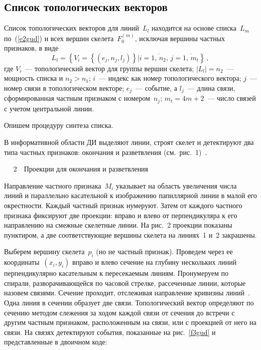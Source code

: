 \begin{multicols}{2}
\subsection{Список топологических векторов} %

Список топологических векторов для линий~$L_l$ находится на основе списка~$L_m$
по~(\ref{e2gud}) и всех вершин скелета~$F_0^{(m)}$, исключая вершины частных признаков, в
виде
\begin{equation}
L_l =\left \{ V_i =\left \{ (e_j, n_j, l_j)\right \}\vert i=\overline{1,\,n_2},\,j=\overline{1,\, m_t}\right
\}\,,
\label{e3gud}
\end{equation}
где $V_i$~--- топологический вектор для группы вершин скелета; $\vert L_l\vert =n_2$~---
мощность списка и $n_2>n_1$; $i$~--- индекс как номер топологического вектора; $j$~--- номер
связи в топологическом векторе; $e_j$~--- событие, а $l_j$~--- длина связи, сформированная
частным признаком с номером~$n_j$; $m_t =4m+2$~--- число связей с учетом центральной
линии.

Опишем процедуру синтеза списка.

В информативной области ДИ выделяют линии, строят скелет и детектируют два типа частных
признаков: окончания и разветвления (см.\ рис.~1)~\cite{5gud}.\linebreak\vspace*{-12pt} 
\begin{center} %
\vspace*{1pt}
\mbox{%
\epsfxsize=74.97mm
}
\vspace*{12pt}
{{\figurename~2}\ \ \small{Проекции для окончания и разветвления}}
\end{center}
\vspace*{6pt}


\addtocounter{figure}{1}

\noindent
Направление частного
признака~$M_i$ указывает на область увеличения числа линий и параллельно касательной к
изображению папиллярной линии в малой его окрестности. Каждый частный признак нумеруют.
Затем от каждого частного признака фиксируют две проекции: вправо и влево от перпендикуляра
к его направлению на смежные скелетные линии. На рис.~2 проекции показаны
пунктиром, а две соответствующие вершины скелета на линиях~1 и~2 закрашены.


Выберем вершину скелета~$p_i$ (но не частный признак). Проведем через ее
координаты~$(x_i,y_i)$ вправо и влево сечение на глубину нескольких линий
перпендикулярно касательным к пе\-ре\-се\-ка\-емым линиям. Пронумеруем по спирали,
разворачивающейся по часовой стрелке, рассеченные линии, которые назовем связями. Сечение
проходит, отслеживая направление кривизны линий~\cite{3gud}. Одна линия в сечении образует
две связи. Топологический вектор определяют по сечению методом слежения за ходом каждой
связи от сечения до встречи с другим частным признаком, расположенным на связи, или с
проекцией от него на связи. На связях детектируют события, показанные на рис.~\ref{f3gud} и
представленные в двоичном коде:


\end{multicols}
